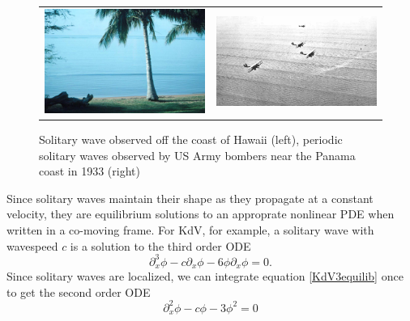 \documentclass[thesis.tex]{subfiles}
\begin{document}
\begin{figure}
\begin{center}
\begin{tabular}{cc}
\includegraphics[width=7cm]{images/intro/beach.jpg} &
\includegraphics[width=7cm]{images/intro/cnoidal.jpg}
\end{tabular}
\caption[Solitary waves in nature]{Solitary wave observed off the coast of Hawaii \cite{ANDRIOPOULOS2009} (left), periodic solitary waves observed by US Army bombers near the Panama coast in 1933 (right) }
\label{fig:waterwave}
\end{center}
\end{figure}

Since solitary waves maintain their shape as they propagate at a constant velocity, they are equilibrium solutions to an approprate nonlinear PDE when written in a co-moving frame. For KdV, for example, a solitary wave with wavespeed $c$ is a solution to the third order ODE 
\begin{equation}\label{KdV3equilib}
\partial_x^3 \phi - c \partial_x \phi - 6 \phi \partial_x \phi = 0.
\end{equation}
Since solitary waves are localized, we can integrate equation \cref{KdV3equilib} once to get the second order ODE
\begin{equation}\label{KdV3eq}
\partial_x^2 \phi - c \phi - 3 \phi^2 = 0
\end{equation}
\end{document}

